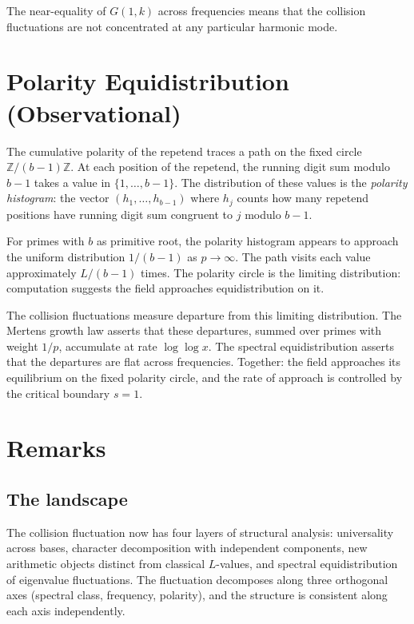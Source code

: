 \documentclass[12pt]{amsart}
\theoremstyle{definition}
\theoremstyle{remark}
\begin{document}
The near-equality of $G(1, k)$ across frequencies means that
the collision fluctuations are not concentrated at any
particular harmonic mode.

\section{Polarity Equidistribution (Observational)}

The cumulative polarity of the repetend traces a path on the
fixed circle $\mathbb{Z}/(b{-}1)\mathbb{Z}$. At each
position of the repetend, the running digit sum modulo $b - 1$
takes a value in $\{1, \ldots, b{-}1\}$. The distribution of
these values is the \emph{polarity histogram}: the vector
$(h_1, \ldots, h_{b-1})$ where $h_j$ counts how many
repetend positions have running digit sum congruent to $j$
modulo $b - 1$.

For primes with $b$ as primitive root, the polarity histogram
appears to approach the uniform distribution $1/(b{-}1)$ as
$p \to \infty$. The path visits each value approximately
$L/(b{-}1)$ times. The polarity circle is the limiting
distribution: computation suggests the field approaches equidistribution
on it.

The collision fluctuations measure departure from this
limiting distribution. The Mertens growth law asserts that these departures,
summed over primes with weight $1/p$, accumulate at rate
$\log\log x$. The spectral equidistribution asserts that the
departures are flat across frequencies. Together: the field
approaches its equilibrium on the fixed polarity circle, and
the rate of approach is controlled by the critical boundary
$s = 1$.

\section{Remarks}

\subsection*{The landscape}

The collision fluctuation now has four layers of structural
analysis: universality across bases, character decomposition
with independent components, new arithmetic objects distinct
from classical $L$-values, and spectral equidistribution of
eigenvalue fluctuations. The fluctuation decomposes along three
orthogonal axes (spectral class, frequency, polarity), and the
structure is consistent along each axis independently.
\end{document}
